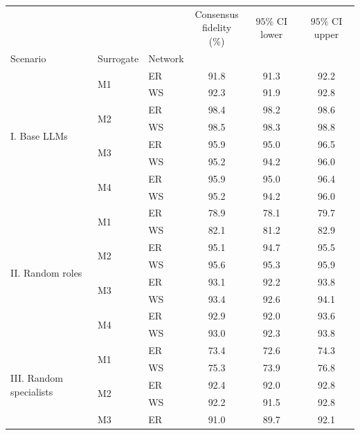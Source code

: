 \begin{table}[ht]
\centering
\begin{adjustbox}{width=\columnwidth}
\begin{tabular}{lllccc}
\toprule
 &  &  & \makecell{Consensus \\ fidelity (\%)} & \makecell{\(95\%\) CI \\ lower} & \makecell{\(95\%\) CI \\ upper} \\
Scenario & Surrogate & Network &  &  &  \\
\midrule
\multirow[c]{8}{*}{I. Base LLMs} & \multirow[c]{2}{*}{M1} & ER & 91.8 & 91.3 & 92.2 \\
 &  & WS & 92.3 & 91.9 & 92.8 \\
\cline{2-6}
 & \multirow[c]{2}{*}{M2} & ER & 98.4 & 98.2 & 98.6 \\
 &  & WS & 98.5 & 98.3 & 98.8 \\
\cline{2-6}
 & \multirow[c]{2}{*}{M3} & ER & 95.9 & 95.0 & 96.5 \\
 &  & WS & 95.2 & 94.2 & 96.0 \\
\cline{2-6}
 & \multirow[c]{2}{*}{M4} & ER & 95.9 & 95.0 & 96.4 \\
 &  & WS & 95.2 & 94.2 & 96.0 \\
\cline{1-6} \cline{2-6}
\multirow[c]{8}{*}{II. Random roles} & \multirow[c]{2}{*}{M1} & ER & 78.9 & 78.1 & 79.7 \\
 &  & WS & 82.1 & 81.2 & 82.9 \\
\cline{2-6}
 & \multirow[c]{2}{*}{M2} & ER & 95.1 & 94.7 & 95.5 \\
 &  & WS & 95.6 & 95.3 & 95.9 \\
\cline{2-6}
 & \multirow[c]{2}{*}{M3} & ER & 93.1 & 92.2 & 93.8 \\
 &  & WS & 93.4 & 92.6 & 94.1 \\
\cline{2-6}
 & \multirow[c]{2}{*}{M4} & ER & 92.9 & 92.0 & 93.6 \\
 &  & WS & 93.0 & 92.3 & 93.8 \\
\cline{1-6} \cline{2-6}
\multirow[c]{8}{*}{III. Random specialists} & \multirow[c]{2}{*}{M1} & ER & 73.4 & 72.6 & 74.3 \\
 &  & WS & 75.3 & 73.9 & 76.8 \\
\cline{2-6}
 & \multirow[c]{2}{*}{M2} & ER & 92.4 & 92.0 & 92.8 \\
 &  & WS & 92.2 & 91.5 & 92.8 \\
\cline{2-6}
 & \multirow[c]{2}{*}{M3} & ER & 91.0 & 89.7 & 92.1 \\

\end{tabular}
\end{adjustbox}
\end{table}
